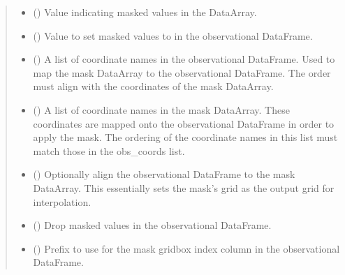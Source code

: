 \documentclass[letterpaper,10pt,english]{sphinxmanual}
\begin{document}
\begin{fulllineitems}
\begin{quote}
\begin{description}
\begin{itemize}
\item {}
\sphinxAtStartPar
{} () \textendash{} Value indicating masked values in the DataArray.

\item {}
\sphinxAtStartPar
{} () \textendash{} Value to set masked values to in the observational DataFrame.

\item {}
\sphinxAtStartPar
{} (\sphinxstyleliteralemphasis{\sphinxupquote{{[}}}\sphinxstyleliteralemphasis{\sphinxupquote{{]}}}) \textendash{} A list of coordinate names in the observational DataFrame. Used to map
the mask DataArray to the observational DataFrame. The order must align
with the coordinates of the mask DataArray.

\item {}
\sphinxAtStartPar
{} (\sphinxstyleliteralemphasis{\sphinxupquote{{[}}}\sphinxstyleliteralemphasis{\sphinxupquote{{]}}}) \textendash{} A list of coordinate names in the mask DataArray. These coordinates are
mapped onto the observational DataFrame in order to apply the mask. The
ordering of the coordinate names in this list must match those in the
obs\_coords list.

\item {}
\sphinxAtStartPar
{} () \textendash{} Optionally align the observational DataFrame to the mask DataArray.
This essentially sets the mask’s grid as the output grid for
interpolation.

\item {}
\sphinxAtStartPar
{} () \textendash{} Drop masked values in the observational DataFrame.

\item {}
\sphinxAtStartPar
{} () \textendash{} Prefix to use for the mask gridbox index column in the observational
DataFrame.


\end{itemize}
\end{description}
\end{quote}
\end{fulllineitems}
\end{document}
